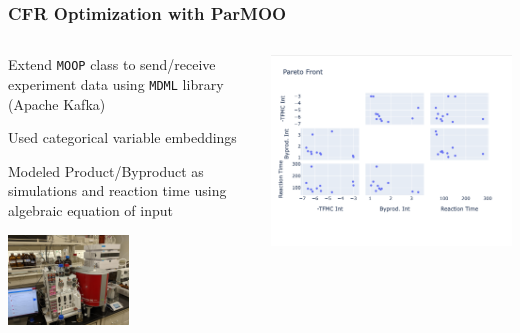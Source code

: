 \documentclass[aspectratio=169]{beamer}
\begin{document}
\begin{frame}\frametitle{CFR Optimization with ParMOO}

\begin{columns}
\begin{column}{0.5\textwidth}

\medskip
Extend {\tt MOOP} class to send/receive experiment data
using {\tt MDML} library (Apache Kafka)

\medskip
Used categorical variable embeddings

\medskip
Modeled Product/Byproduct as simulations and reaction time using algebraic
equation of input

\begin{center}
\includegraphics[width=0.5\textwidth]{lab_setup.jpg}\\
\end{center}
\end{column}
\begin{column}{0.5\textwidth}
\includegraphics[width=\textwidth]{pareto_front.png}
\end{column}
\end{columns}
\end{frame}
\end{document}
